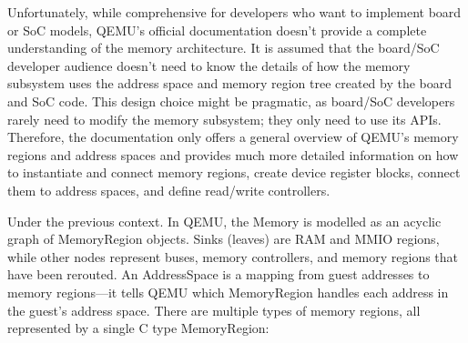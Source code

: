 Unfortunately, while comprehensive for developers who want to implement board 
or SoC models, QEMU's official documentation doesn't provide a complete 
understanding of the memory architecture. It is assumed that the board/SoC developer 
audience doesn't need to know the details of how the memory subsystem uses the 
address space and memory region tree created by the board and SoC code. This 
design choice might be pragmatic, as board/SoC developers rarely need to modify 
the memory subsystem; they only need to use its APIs. Therefore, the documentation 
only offers a general overview of QEMU's memory regions and address spaces 
and provides much more detailed information on how to instantiate and connect 
memory regions, create device register blocks, connect them to address spaces, and 
define read/write controllers.

Under the previous context. In QEMU, the Memory is modelled as an acyclic 
graph of MemoryRegion objects. Sinks (leaves) are RAM and MMIO regions, while 
other nodes represent buses, memory controllers, and memory regions that have 
been rerouted. An AddressSpace is a mapping from guest addresses to memory 
regions—it tells QEMU which MemoryRegion handles each address in the guest's 
address space. There are multiple types of memory regions, all represented by a 
single C type MemoryRegion\cite{Qemu_MMIO_Ops}:

